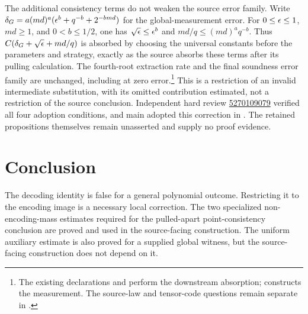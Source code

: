 \documentclass[11pt]{article}
\begin{document}
The additional consistency terms do not weaken the source error family.  Write
$\delta_G=a(md)^a(\epsilon^b+q^{-b}+2^{-bmd})$ for the global-measurement error.
For $0\leq\epsilon\leq1$, $md\geq1$, and $0<b\leq1/2$, one has
$\sqrt{\epsilon}\leq\epsilon^b$ and $md/q\leq(md)^a q^{-b}$.
Thus $C(\delta_G+\sqrt{\epsilon}+md/q)$ is absorbed by choosing the universal
constants before the parameters and strategy, exactly as the source absorbs
these terms after its pulling calculation.  The fourth-root extraction rate
and the final soundness error family are unchanged, including at zero
error.\footnote{The existing declarations  and
 perform the downstream
absorption;  constructs the measurement.
The source-law and tensor-code questions remain separate in
.}
This is a restriction of an invalid intermediate substitution, with its omitted
contribution estimated, not a restriction of the source conclusion.  Independent
hard review
\href{https://github.com/Dengnifer/MIPStarRE-QPBT/pull/672#pullrequestreview-5270109079}%
{5270109079} verified all four adoption conditions, and main adopted this
correction in
.  The retained
propositions themselves remain unasserted and supply no proof evidence.

\section{Conclusion}

The decoding identity is false for a general polynomial outcome.  Restricting
it to the encoding image is a necessary local correction.  The two specialized
non-encoding-mass estimates required for the pulled-apart point-consistency
conclusion are proved and used in the source-facing construction. The uniform
auxiliary estimate is also proved for a supplied global witness, but the
source-facing construction does not depend on it.



\end{document}
